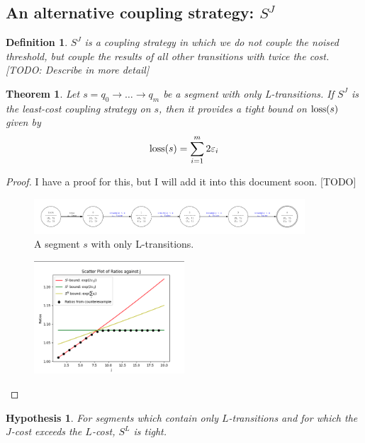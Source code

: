 \documentclass{article}
\newtheorem{theorem}{Theorem}
\newtheorem{hypothesis}{Hypothesis}[section]
\newtheorem{definition}{Definition}[section]
\renewcommand{\epsilon}{\varepsilon}
\newcommand{\loss}{\textup{loss}}
\newcommand{\1}{\langle 1 \rangle}
\newcommand{\2}{\langle 2 \rangle}
\begin{document}
\subsection{An alternative coupling strategy: $S^J$}

\begin{definition}
    $S^J$ is a coupling strategy in which we do not couple the noised threshold, but couple the results of all other transitions with twice the cost. [TODO: Describe in more detail]
\end{definition}

\begin{theorem}
    Let $s = q_0 \to \dots \to q_m$ be a segment with only L-transitions. If $S^J$ is the least-cost coupling strategy on $s$, then it provides a tight bound on $\loss(s)$ given by \[\loss(s) = \sum_{i = 1}^{m} 2\epsilon_i\]
\end{theorem}

\begin{proof}
    I have a proof for this, but I will add it into this document soon. [TODO]

    \begin{figure}[H]
        \centering
        \includegraphics[width=0.9\textwidth]{figures/only_l_transitions.png}
        \caption{A segment $s$ with only L-transitions.}
        \label{fig:segment_j}
    \end{figure}

    \begin{figure}[H]
        \centering
        \includegraphics[width=0.5\textwidth]{figures/only_l_transitions_plot.png}
        \caption{}
        \label{fig:segment_j_coupling}
    \end{figure}
\end{proof}

\begin{hypothesis}
    For segments which contain only $L$-transitions and for which the $J$-cost exceeds the $L$-cost, $S^L$ is tight.
\end{hypothesis}
\end{document}
